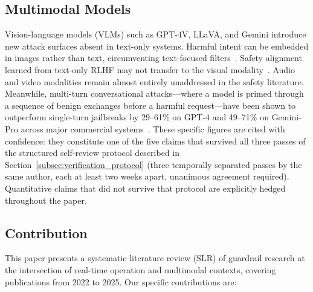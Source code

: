 \subsection{Multimodal Models}

Vision-language models (VLMs) such as GPT-4V, LLaVA, and Gemini introduce new attack
surfaces absent in text-only systems.
Harmful intent can be embedded in images rather than text, circumventing text-focused
filters~\cite{gong2023figstep,liu2023queryrelevant}.
Safety alignment learned from text-only RLHF may not transfer to the visual
modality~\cite{zhao2024evaluating}.
Audio and video modalities remain almost entirely unaddressed in the safety literature.
Meanwhile, multi-turn conversational attacks---where a model is primed through a sequence
of benign exchanges before a harmful request---have been shown to outperform single-turn
jailbreaks by 29--61\% on GPT-4 and 49--71\% on Gemini-Pro across major commercial
systems~\cite{russinovich2024greatescalation}.
These specific figures are cited with confidence: they constitute one of the five claims
that survived all three passes of the structured self-review protocol described in
Section~\ref{subsec:verification_protocol} (three temporally separated passes by the
same author, each at least two weeks apart, unanimous agreement required).
Quantitative claims that did not survive that protocol are explicitly hedged throughout
the paper.

\subsection{Contribution}

This paper presents a systematic literature review (SLR) of guardrail research at the
intersection of real-time operation and multimodal contexts, covering publications from
2022 to 2025.
Our specific contributions are:


